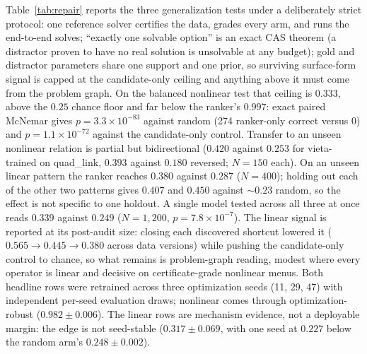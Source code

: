 \documentclass[letterpaper]{article} %
\begin{document}
Table~\ref{tab:repair} reports the three generalization tests under a deliberately strict
protocol: one reference solver certifies the data, grades every arm,
and runs the end-to-end solves; ``exactly one solvable option'' is an exact CAS theorem (a
distractor proven to have no real solution is unsolvable at any budget); gold and distractor
parameters share one support and one prior, so surviving surface-form signal is capped at the
candidate-only ceiling and anything above it must come from the problem graph. On the balanced nonlinear test that ceiling is $0.333$, above the $0.25$ chance floor and
far below the ranker's $0.997$: exact paired McNemar gives $p = 3.3\times10^{-83}$ against
random (274 ranker-only correct versus 0) and $p = 1.1\times10^{-72}$ against the
candidate-only control. Transfer to an unseen nonlinear relation is partial but bidirectional ($0.420$ against
$0.253$ for vieta-trained on quad\_link, $0.393$ against $0.180$ reversed; $N{=}150$ each). On an unseen linear pattern the ranker reaches $0.380$ against $0.287$ ($N{=}400$); holding
out each of the other two patterns gives $0.407$ and $0.450$ against $\sim$$0.23$ random, so
the effect is not specific to one holdout. A single model tested across all three at once reads $0.339$ against $0.249$
($N{=}1{,}200$, $p = 7.8\times10^{-7}$). The linear signal is reported at its post-audit size: closing each discovered shortcut
lowered it ($0.565 \to 0.445 \to 0.380$ across data versions) while pushing the
candidate-only control to chance, so what remains is problem-graph reading, modest where
every operator is linear and decisive on certificate-grade nonlinear menus. Both headline rows were retrained across three optimization seeds (11, 29, 47) with
independent per-seed evaluation draws; nonlinear comes through optimization-robust
($0.982 \pm 0.006$).
The linear rows are mechanism evidence, not a deployable margin: the edge is not seed-stable
($0.317 \pm 0.069$, with one seed at $0.227$ below the random arm's $0.248 \pm 0.002$).
\end{document}
